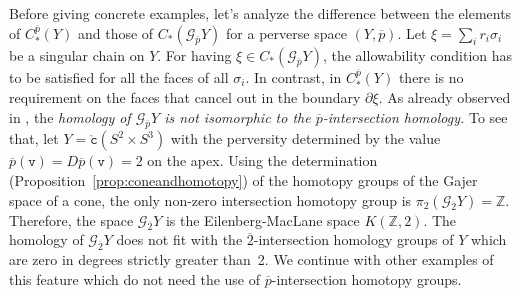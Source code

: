 \documentclass[a4paper,10pt,english,reqno]{amsart}
\theoremstyle{plain}
\theoremstyle{definition}
\theoremstyle{remark}
\numberwithin{equation}{section}
\newcommand{\propref}[1]{Proposition~\ref{#1}}
\def\ov{\overline}
\def\crG{{\mathscr G}}
\def\tc{{\mathtt c}}
\def\tv{{\mathtt v}}
\def\Z{\mathbb{Z}}
\def\rc{{\mathring{\tc}}}
\renewcommand\1{\hbox{\ding{192}}}
\renewcommand\2{\hbox{\ding{193}}}
\newcommand\3{\hbox{\ding{194}}}
\newcommand\4{\hbox{\ding{195}}}
\begin{document}
Before  giving concrete examples, let's analyze
 the difference between the elements of $C_{*}^{\ov{p}}(Y)$ and those of $C_{*}(\crG_{\ov{p}}Y)$
 for a perverse space $(Y,\ov{p})$.
Let  $\xi=\sum_{i}r_{i}\sigma_{i}$ be a singular chain on  $Y$. For having
$\xi\in C_{*}(\crG_{\ov{p}}Y)$, the allowability condition has to be satisfied for all the faces of all $\sigma_{i}$.
In contrast, in $C_{*}^{\ov{p}}(Y)$ there is no requirement on the faces that cancel out in the boundary $\partial \xi$.
As already observed in \cite{MR1489215}, the 
\emph{homology of $\crG_{\ov{p}}Y$ is not isomorphic to the $\ov{p}$-intersection homology.}
To see that, let $Y=\rc (S^2\times S^3)$ with the perversity determined by the value 
$\ov{p}(\tv)=D\ov{p}(\tv)=2$ on the apex. 
Using the determination (\propref{prop:coneandhomotopy}) of the homotopy groups of the Gajer space of a cone, 
%
the only non-zero intersection homotopy group is
$\pi_{2}(\crG_{\ov{2}}Y)=\Z$. Therefore, the space $\crG_{\ov{2}}Y$ is the Eilenberg-MacLane space $K(\Z,2)$.
The homology of $\crG_{\ov{2}}Y$ does not fit with the $\ov{2}$-intersection homology groups of $Y$ which are zero in degrees strictly greater than~2.
 We continue with other examples of this feature 
 which do not need the use of $\ov{p}$-intersection homotopy groups.
\end{document}
